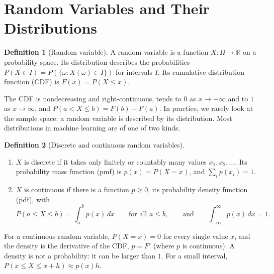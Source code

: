 \documentclass[11pt]{article}
\theoremstyle{definition}
\newtheorem{definition}{Definition}[section]
\theoremstyle{plain}
\theoremstyle{remark}
\begin{document}
\section{Random Variables and Their Distributions}\label{sec:random-variables}

\begin{definition}[Random variable]\label{def:random-variable}
    A random variable is a function $X: \Omega \to \mathbb{R}$ on a probability space. Its distribution describes the probabilities $P(X \in I) = P(\{\omega : X(\omega) \in I\})$ for intervals $I$. Its cumulative distribution function (CDF) is $F(x) = P(X \leq x)$.
\end{definition}

The CDF is nondecreasing and right-continuous, tends to $0$ as $x \to -\infty$ and to $1$ as $x \to \infty$, and $P(a < X \leq b) = F(b) - F(a)$. In practice, we rarely look at the sample space: a random variable is described by its distribution. Most distributions in machine learning are of one of two kinds.

\begin{definition}[Discrete and continuous random variables]\label{def:pmf-pdf}
    \begin{enumerate}
        \item $X$ is discrete if it takes only finitely or countably many values $x_1, x_2, \ldots$. Its probability mass function (pmf) is $p(x) = P(X = x)$, and $\sum_i p(x_i) = 1$.
        \item $X$ is continuous if there is a function $p \geq 0$, its probability density function (pdf), with
        \[P(a \leq X \leq b) = \int_a^b p(x) \, dx \qquad \text{for all } a \leq b, \qquad \text{and} \qquad \int_{-\infty}^\infty p(x) \, dx = 1.\]
    \end{enumerate}
\end{definition}

For a continuous random variable, $P(X = x) = 0$ for every single value $x$, and the density is the derivative of the CDF, $p = F'$ (where $p$ is continuous). A density is not a probability: it can be larger than $1$. For a small interval, $P(x \leq X \leq x + h) \approx p(x)h$.
\end{document}
